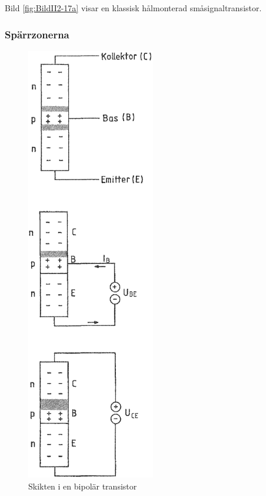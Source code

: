 Bild \ref{fig:BildII2-17a} visar en klassisk hålmonterad småsignaltransistor.

\subsubsection{Spärrzonerna}

\begin{figure}
\includegraphics[width=0.5\textwidth]{images/cropped_pdfs/bild_2_2-17.pdf}
\caption{Skikten i en bipolär transistor}
\label{fig:BildII2-17}
\end{figure}

